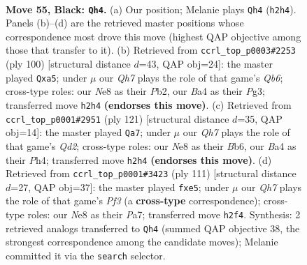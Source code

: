 \documentclass[11pt]{article}
\begin{document}
\clearpage

\begin{figure}[p]\centering
\begin{subfigure}{0.46\textwidth}\centering
\resizebox{\linewidth}{!}{%
\newchessgame
\chessboard[
  setfen={4n2k/8/p3P3/3P1Q1p/b5p1/N7/5P1q/5KN1 b - - 0 55},
  showmover=false,
  pgfstyle=straightmove, color=movearrow, markmove={h2-h4}
]}
\caption{}
\end{subfigure}\hfill
\begin{subfigure}{0.46\textwidth}\centering
\resizebox{\linewidth}{!}{%
\newchessgame
\chessboard[
  setfen={8/4q1k1/1Q6/pp1Bpp2/3n3P/6PK/1P6/8 w - - 4 51},
  showmover=false,
  pgfstyle=straightmove, color=movearrow, markmove={b6-a5}
]}
\caption{}
\end{subfigure}
\\[4pt]
\begin{subfigure}{0.46\textwidth}\centering
\resizebox{\linewidth}{!}{%
\newchessgame
\chessboard[
  setfen={8/3q1pk1/1b4p1/8/4QP1p/3N3P/6P1/5K2 b - - 35 61},
  showmover=false,
  pgfstyle=straightmove, color=movearrow, markmove={d7-a7}
]}
\caption{}
\end{subfigure}\hfill
\begin{subfigure}{0.46\textwidth}\centering
\resizebox{\linewidth}{!}{%
\newchessgame
\chessboard[
  setfen={8/p6k/3q1pp1/4N2p/8/1P5P/P3Q1P1/7K b - - 0 56},
  showmover=false,
  pgfstyle=straightmove, color=movearrow, markmove={f6-e5}
]}
\caption{}
\end{subfigure}
\caption{\textbf{Move 55, Black: \texttt{Qh4}.} (a) Our position; Melanie plays \texttt{Qh4} (\texttt{h2h4}). Panels (b)--(d) are the retrieved master positions whose correspondence most drove this move (highest QAP objective among those that transfer to it). (b) Retrieved from \texttt{ccrl\_top\_p0003\#2253} (ply 100) [structural distance $d$=43, QAP obj=24]: the master played \texttt{Qxa5}; under $\mu$ our \emph{Qh7} plays the role of that game's \emph{Qb6}; cross-type roles: our \emph{N}e8 as their \emph{P}b2, our \emph{B}a4 as their \emph{P}g3; transferred move \texttt{h2h4} \textbf{(endorses this move)}. (c) Retrieved from \texttt{ccrl\_top\_p0001\#2951} (ply 121) [structural distance $d$=35, QAP obj=14]: the master played \texttt{Qa7}; under $\mu$ our \emph{Qh7} plays the role of that game's \emph{Qd2}; cross-type roles: our \emph{N}e8 as their \emph{B}b6, our \emph{B}a4 as their \emph{P}h4; transferred move \texttt{h2h4} \textbf{(endorses this move)}. (d) Retrieved from \texttt{ccrl\_top\_p0001\#3423} (ply 111) [structural distance $d$=27, QAP obj=37]: the master played \texttt{fxe5}; under $\mu$ our \emph{Qh7} plays the role of that game's \emph{Pf3} (a \textbf{cross-type} correspondence); cross-type roles: our \emph{N}e8 as their \emph{P}a7; transferred move \texttt{h2f4}. Synthesis: 2 retrieved analogs transferred to \texttt{Qh4} (summed QAP objective 38, the strongest correspondence among the candidate moves); Melanie committed it via the \texttt{search} selector.}
\label{fig:thought-m109}
\end{figure}
\end{document}

